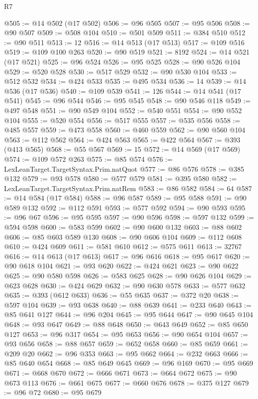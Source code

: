 \begin{lexlean}{R7}
\begin{coremodule}
@505 := @14 @502 (@17 @502)
@506 := @96 @505
@507 := @95 @506
@508 := @90 @507
@509 := @508 @104
@510 := @501 @509
@511 := @384 @510
@512 := @90 @511
@513 := 12
@516 := @14 @513 (@17 @513)
@517 := @109 @516
@519 := @109 @100 @263
@520 := @90 @519
@521 := 8192
@524 := @14 @521 (@17 @521)
@525 := @96 @524
@526 := @95 @525
@528 := @90 @526 @104
@529 := @520 @528
@530 := @517 @529
@532 := @90 @530 @104
@533 := @512 @532
@534 := @424 @533
@535 := @495 @534
@536 := 14
@539 := @14 @536 (@17 @536)
@540 := @109 @539
@541 := 126
@544 := @14 @541 (@17 @541)
@545 := @96 @544
@546 := @95 @545
@548 := @90 @546 @118
@549 := @497 @548
@551 := @90 @549 @104
@552 := @540 @551
@554 := @90 @552 @104
@555 := @520 @554
@556 := @517 @555
@557 := @535 @556
@558 := @485 @557
@559 := @473 @558
@560 := @460 @559
@562 := @90 @560 @104
@563 := @112 @562
@564 := @424 @563
@565 := @422 @564
@567 := @393 (@413 @565)
@568 := @55 @567
@569 := 15
@572 := @14 @569 (@17 @569)
@574 := @109 @572 @263
@575 := @85 @574
@576 := LexLeanTarget.TargetSyntax.Prim.natQuot
@577 := @86 @576
@578 := @385 @132
@579 := @93 @578
@580 := @577 @579
@581 := @395 @580
@582 := LexLeanTarget.TargetSyntax.Prim.natRem
@583 := @86 @582
@584 := 64
@587 := @14 @584 (@17 @584)
@588 := @96 @587
@589 := @95 @588
@591 := @90 @589 @132
@592 := @112 @591
@593 := @577 @592
@594 := @90 @593
@595 := @96 @67
@596 := @95 @595
@597 := @90 @596
@598 := @597 @132
@599 := @594 @598
@600 := @583 @599
@602 := @90 @600 @132
@603 := @88 @602
@606 := @85 @603 @589 @130
@608 := @90 @606 @104
@609 := @112 @608
@610 := @424 @609
@611 := @581 @610
@612 := @575 @611
@613 := 32767
@616 := @14 @613 (@17 @613)
@617 := @96 @616
@618 := @95 @617
@620 := @90 @618 @104
@621 := @93 @620
@622 := @424 @621
@623 := @90 @622
@625 := @90 @580 @598
@626 := @583 @625
@628 := @90 @626 @104
@629 := @623 @628
@630 := @424 @629
@632 := @90 @630 @578
@633 := @577 @632
@635 := @393 (@612 @633)
@636 := @55 @635
@637 := @372 @20
@638 := @597 @104
@639 := @93 @638
@640 := @88 @639
@641 := @233 @640
@643 := @85 @641 @127
@644 := @96 @204
@645 := @95 @644
@647 := @90 @645 @104
@648 := @93 @647
@649 := @88 @648
@650 := @643 @649
@652 := @85 @650 @127
@653 := @96 @317
@654 := @95 @653
@656 := @90 @654 @104
@657 := @93 @656
@658 := @88 @657
@659 := @652 @658
@660 := @85 @659
@661 := @209 @20
@662 := @96 @353
@663 := @95 @662
@664 := @232 @663
@666 := @85 @640 @654
@668 := @85 @649 @645
@669 := @96 @169
@670 := @95 @669
@671 := @668 @670
@672 := @666 @671
@673 := @664 @672
@675 := @90 @673 @113
@676 := @661 @675
@677 := @660 @676
@678 := @375 @127
@679 := @96 @72
@680 := @95 @679

\end{coremodule}
\end{lexlean}
